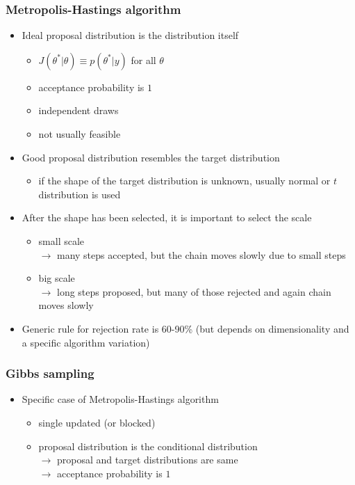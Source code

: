 \documentclass[10pt]{beamer}
\begin{document}
\begin{frame}

\frametitle{ Metropolis-Hastings algorithm}

  \begin{itemize}
  \item Ideal proposal distribution is the distribution itself
    \begin{itemize}
    \item $J(\theta^{*}|\theta)\equiv p(\theta^{*}|y)$ for all
      $\theta$
    \item acceptance probability is $1$
    \item independent draws
    \item not usually feasible
    \end{itemize}
  \item<2-> Good proposal distribution resembles the target distribution
    \begin{itemize}
    \item if the shape of the target distribution is unknown, usually
      normal or $t$ distribution is used
    \end{itemize}
  \item<3-> After the shape has been selected, it is important to select the scale
    \begin{itemize}
    \item small scale \\$\rightarrow$ many steps accepted, but the chain moves slowly due to small steps
    \item big scale \\$\rightarrow$ long steps proposed, but many of
      those rejected and again chain moves slowly
    \end{itemize}
  \item<4-> Generic rule for rejection rate is 60-90\% (but depends on
    dimensionality and a specific algorithm variation)
\end{itemize}

\end{frame}

\begin{frame}

\frametitle{ Gibbs sampling}

  \begin{itemize}
  \item Specific case of Metropolis-Hastings algorithm
    \begin{itemize}
    \item single updated (or blocked)
    \item proposal distribution is the conditional distribution\\
      $\rightarrow$ proposal and target distributions are same\\
      $\rightarrow$ acceptance probability is $1$
    \end{itemize}
  \end{itemize}

\end{frame}
\end{document}
